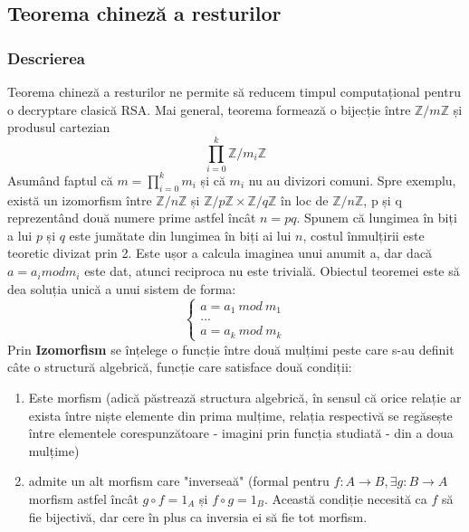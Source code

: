 \documentclass[12]{report}
\begin{document}
     \subsection{Teorema chineză a resturilor}
      \subsubsection{Descrierea}
      Teorema chineză a resturilor ne permite să reducem timpul computațional pentru o decryptare clasică RSA. Mai general, teorema formează o bijecție între $ \mathbb{Z}/m\mathbb{Z} $ și produsul cartezian \\
      $$ \prod_{i=0}^{k} \mathbb{Z}/m_i\mathbb{Z} $$
      Asumând faptul că $ m = \prod_{i=0}^{k} m_i $ și că $ m_i $ nu au divizori comuni. Spre exemplu, există un izomorfism între $ \mathbb{Z}/n\mathbb{Z}$ și $\mathbb{Z}/p\mathbb{Z} \times \mathbb{Z}/q\mathbb{Z}  $ în loc de $ \mathbb{Z}/n\mathbb{Z} $, p și q reprezentând două numere prime astfel încât $ n=pq$. Spunem că lungimea în biți a lui $p$ și $q$ este jumătate din lungimea în biți ai lui $n$, costul înmulțirii este teoretic divizat prin 2. Este ușor a calcula imaginea unui anumit a, dar dacă $ a= a_i mod m_i$ este dat, atunci reciproca nu este trivială. Obiectul teoremei este să dea soluția unică a unui sistem de forma: \\
    \[
\left\{ 
\begin{array}{c}
a=a_1 \ mod \ m_1 \\ 
... \\ 
a=a_k \ mod \ m_k
\end{array}
\right. 
\]
Prin \textbf{Izomorfism} se înțelege o funcție între două mulțimi peste care s-au definit câte o structură algebrică, funcție care satisface două condiții: \\
\begin{enumerate}
\item Este morfism (adică păstrează structura algebrică, în sensul că orice relație ar exista între niște elemente din prima mulțime, relația respectivă se regăsește între elementele corespunzătoare - imagini prin funcția studiată - din a doua mulțime)

\item admite un alt morfism care "inverseaă" (formal pentru $f:A \longrightarrow B, \exists g:B\longrightarrow A$ morfism astfel încât $g \circ f = 1_A$ și $f \circ g =1_B$. Această condiție necesită ca $f$ să fie bijectivă, dar cere în plus ca inversia ei să fie tot morfism.
\end{enumerate} 
\end{document}
